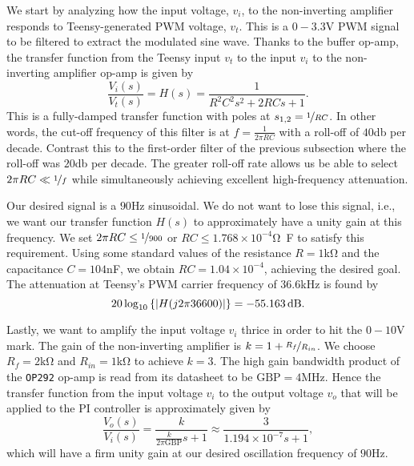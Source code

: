 We start by analyzing how the input voltage, $v_i$, to the non-inverting
amplifier responds to Teensy-generated PWM voltage, $v_t$. This is a
$0-3.3$\unit{\volt} PWM signal to be filtered to extract the modulated sine
wave. Thanks to the buffer op-amp, the transfer function from the Teensy input
$v_t$ to the input $v_i$ to the non-inverting amplifier op-amp is given by \[
\frac{V_i(s)}{V_t(s)} = H(s) = \frac{1}{R^2C^2s^2+2RCs+1}.\]
%
This is a fully-damped transfer function with poles at $s_{1,2} =
\nicefrac{1}{RC}$. In other words, the cut-off frequency of this filter is at $f
= \frac{1}{2\pi RC}$ with a roll-off of $40$\unit{\decibel} per decade. Contrast
this to the first-order filter of the previous subsection where the roll-off was
$20$\unit{\decibel} per decade. The greater roll-off rate allows us be able to
select $2\pi RC \ll \nicefrac{1}{f}$ while simultaneously achieving excellent
high-frequency attenuation.

Our desired signal is a $90$\unit{\hertz} sinusoidal. We do not want to lose
this signal, i.e., we want our transfer function $H(s)$ to approximately have a
unity gain at this frequency. We set $2\pi RC \leq \nicefrac{1}{900}$ or $RC
\leq 1.768 \times 10^{-4}$\unit{\ohm\farad} to satisfy this requirement. Using
some standard values of the resistance $R = 1$\unit{\kilo\ohm} and the
capacitance $C = 104$\unit{\nano\farad}, we obtain $RC = 1.04 \times 10^{-4}$,
achieving the desired goal. The attenuation at Teensy's PWM carrier frequency of
$36.6$\unit{\kilo\hertz} is found by \[ 20 \log_{10}\left\{\abs{H(j 2\pi
36600)}\right\} = -55.163\,\unit{\decibel}. \]

Lastly, we want to amplify the input voltage $v_i$ thrice in order to hit the
$0-10$\unit{\volt} mark. The gain of the non-inverting amplifier is $k = 1 +
\nicefrac{R_f}{R_{in}}$. We choose $R_f = 2$\unit{\kilo\ohm} and $R_{in} =
1$\unit{\kilo\ohm} to achieve $k = 3$. The high gain bandwidth product of the
\texttt{OP292} op-amp is read from its datasheet to be $\text{GBP} =
4$\unit{\mega\hertz}. Hence the transfer function from the input voltage $v_i$
to the output voltage $v_o$ that will be applied to the PI controller is
approximately given by \[ \frac{V_o(s)}{V_i(s)} =
\frac{k}{\frac{k}{2\pi\text{GBP}}s + 1} \approx \frac{3}{1.194\times 10^{-7}s +
1}, \] which will have a firm unity gain at our desired oscillation frequency of
$90$\unit{\hertz}.
